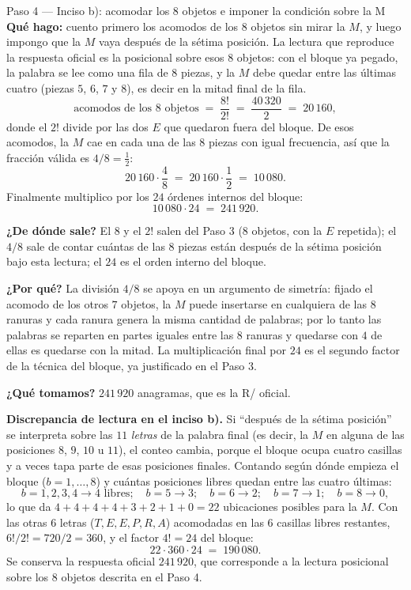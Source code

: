 \documentclass[11pt]{article}
\begin{document}
\begin{paso}{Paso 4 --- Inciso b): acomodar los 8 objetos e imponer la condición sobre la M}
\textbf{Qué hago:} cuento primero los acomodos de los $8$ objetos sin mirar la $M$, y luego impongo que la
$M$ vaya después de la sétima posición. La lectura que reproduce la respuesta oficial es la posicional
sobre esos $8$ objetos: con el bloque ya pegado, la palabra se lee como una fila de $8$ piezas, y la $M$
debe quedar entre las últimas cuatro (piezas $5$, $6$, $7$ y $8$), es decir en la mitad final de la fila.
\[
\text{acomodos de los 8 objetos} \;=\; \frac{8!}{2!} \;=\; \frac{40\,320}{2} \;=\; 20\,160 ,
\]
donde el $2!$ divide por las dos $E$ que quedaron fuera del bloque. De esos acomodos, la $M$ cae en cada una
de las $8$ piezas con igual frecuencia, así que la fracción válida es $4/8=\tfrac12$:
\[
20\,160\cdot\frac{4}{8} \;=\; 20\,160\cdot\frac12 \;=\; 10\,080 .
\]
Finalmente multiplico por los $24$ órdenes internos del bloque:
\[
10\,080\cdot 24 \;=\; 241\,920 .
\]

\textbf{¿De dónde sale?} El $8$ y el $2!$ salen del Paso 3 ($8$ objetos, con la $E$ repetida); el $4/8$ sale
de contar cuántas de las $8$ piezas están después de la sétima posición bajo esta lectura; el $24$ es el
orden interno del bloque.

\textbf{¿Por qué?} La división $4/8$ se apoya en un argumento de simetría: fijado el acomodo de los otros
$7$ objetos, la $M$ puede insertarse en cualquiera de las $8$ ranuras y cada ranura genera la misma cantidad
de palabras; por lo tanto las palabras se reparten en partes iguales entre las $8$ ranuras y quedarse con
$4$ de ellas es quedarse con la mitad. La multiplicación final por $24$ es el segundo factor de la técnica
del bloque, ya justificado en el Paso 3.

\textbf{¿Qué tomamos?} $241\,920$ anagramas, que es la R/ oficial.
\end{paso}

\begin{nota}
\textbf{Discrepancia de lectura en el inciso b).} Si ``después de la sétima posición'' se interpreta sobre
las $11$ \emph{letras} de la palabra final (es decir, la $M$ en alguna de las posiciones $8$, $9$, $10$ u
$11$), el conteo cambia, porque el bloque ocupa cuatro casillas y a veces tapa parte de esas posiciones
finales. Contando según dónde empieza el bloque ($b=1,\dots,8$) y cuántas posiciones libres quedan entre las
cuatro últimas:
\[
b=1,2,3,4 \to 4 \text{ libres};\quad b=5\to 3;\quad b=6\to 2;\quad b=7\to 1;\quad b=8\to 0,
\]
lo que da $4+4+4+4+3+2+1+0=22$ ubicaciones posibles para la $M$. Con las otras $6$ letras
($T,E,E,P,R,A$) acomodadas en las $6$ casillas libres restantes, $6!/2!=720/2=360$, y el factor $4!=24$ del
bloque:
\[
22\cdot 360\cdot 24 \;=\; 190\,080 .
\]
Se conserva la respuesta oficial $241\,920$, que corresponde a la lectura posicional sobre los $8$ objetos
descrita en el Paso 4.
\end{nota}
\end{document}
